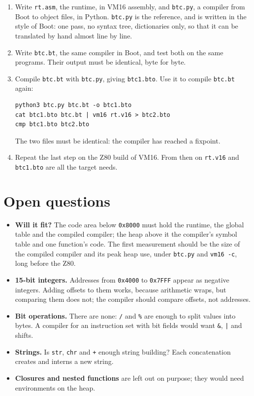 \documentclass[11pt,a4paper]{article}
\newcommand{\lang}{Boot}
\newcommand{\hx}[1]{\texttt{0x#1}}
\newcommand{\vm}{VM16}
\begin{document}
\begin{enumerate}[nosep]
\item Write \texttt{rt.asm}, the runtime, in \vm{} assembly, and
  \texttt{btc.py}, a compiler from \lang{} to object files, in Python.
  \texttt{btc.py} is the reference, and is written in the style of \lang{}:
  one pass, no syntax tree, dictionaries only, so that it can be translated
  by hand almost line by line.
\item Write \texttt{btc.bt}, the same compiler in \lang{}, and test both on
  the same programs. Their output must be identical, byte for byte.
\item Compile \texttt{btc.bt} with \texttt{btc.py}, giving
  \texttt{btc1.bto}. Use it to compile \texttt{btc.bt} again:
\begin{lstlisting}[style=shell]
python3 btc.py btc.bt -o btc1.bto
cat btc1.bto btc.bt | vm16 rt.v16 > btc2.bto
cmp btc1.bto btc2.bto
\end{lstlisting}
  The two files must be identical: the compiler has reached a fixpoint.
\item Repeat the last step on the Z80 build of \vm{}. From then on
  \texttt{rt.v16} and \texttt{btc1.bto} are all the target needs.
\end{enumerate}

\section{Open questions}

\begin{itemize}[nosep]
\item \textbf{Will it fit?} The code area below \hx{8000} must hold the
  runtime, the global table and the compiled compiler; the heap above it the
  compiler's symbol table and one function's code. The first measurement
  should be the size of the compiled compiler and its peak heap use, under
  \texttt{btc.py} and \texttt{vm16 -c}, long before the Z80.
\item \textbf{15-bit integers.} Addresses from \hx{4000} to \hx{7FFF}
  appear as negative integers. Adding offsets to them works, because
  arithmetic wraps, but comparing them does not; the compiler should compare
  offsets, not addresses.
\item \textbf{Bit operations.} There are none: \verb|/| and \verb|%| are
  enough to split values into bytes. A compiler for an instruction set with
  bit fields would want \verb|&|, \verb.|. and shifts.
\item \textbf{Strings.} Is \texttt{str}, \texttt{chr} and \verb|+| enough
  string building? Each concatenation creates and interns a new string.
\item \textbf{Closures and nested functions} are left out on purpose; they
  would need environments on the heap.
\end{itemize}
\end{document}

